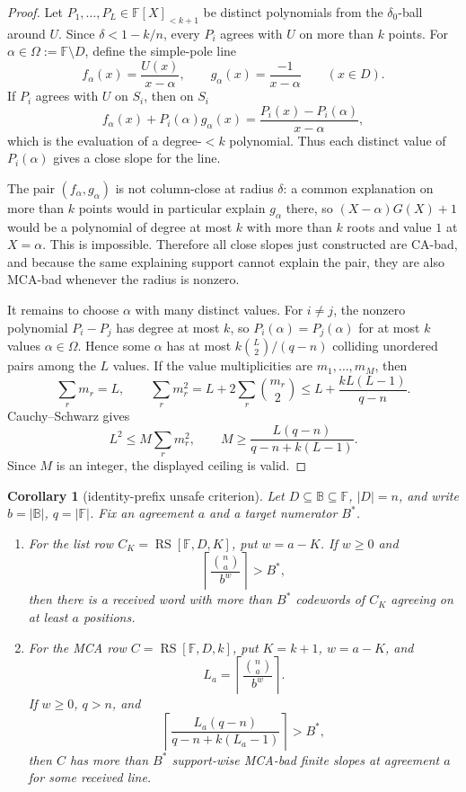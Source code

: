 \documentclass[a4paper,11pt]{amsart}
\newtheorem{corollary}[corollary]{Corollary}
\theoremstyle{remark}
\newcommand{\F}{\mathbb F}
\newcommand{\B}{\mathbb B}
\newcommand{\RS}{\operatorname{RS}}
\begin{document}
\begin{proof}
Let \(P_1,\ldots,P_L\in\F[X]_{<k+1}\) be distinct polynomials from the \(\delta_0\)-ball around \(U\).  Since \(\delta<1-k/n\), every \(P_i\) agrees with \(U\) on more than \(k\) points.  For \(\alpha\in\Omega:=\F\setminus D\), define the simple-pole line
\[
        f_\alpha(x)=\frac{U(x)}{x-\alpha},
        \qquad
        g_\alpha(x)=\frac{-1}{x-\alpha}
        \qquad(x\in D).
\]
If \(P_i\) agrees with \(U\) on \(S_i\), then on \(S_i\)
\[
        f_\alpha(x)+P_i(\alpha)g_\alpha(x)
        =\frac{P_i(x)-P_i(\alpha)}{x-\alpha},
\]
which is the evaluation of a degree-\(<k\) polynomial.  Thus each distinct value of \(P_i(\alpha)\) gives a close slope for the line.

The pair \((f_\alpha,g_\alpha)\) is not column-close at radius \(\delta\): a common explanation on more than \(k\) points would in particular explain \(g_\alpha\) there, so \((X-\alpha)G(X)+1\) would be a polynomial of degree at most \(k\) with more than \(k\) roots and value \(1\) at \(X=\alpha\).  This is impossible.  Therefore all close slopes just constructed are CA-bad, and because the same explaining support cannot explain the pair, they are also MCA-bad whenever the radius is nonzero.

It remains to choose \(\alpha\) with many distinct values.  For \(i\ne j\), the nonzero polynomial \(P_i-P_j\) has degree at most \(k\), so \(P_i(\alpha)=P_j(\alpha)\) for at most \(k\) values \(\alpha\in\Omega\).  Hence some \(\alpha\) has at most \(k\binom L2/(q-n)\) colliding unordered pairs among the \(L\) values.  If the value multiplicities are \(m_1,\ldots,m_M\), then
\[
        \sum_r m_r=L,\qquad
        \sum_r m_r^2
        =L+2\sum_r\binom{m_r}{2}
        \le L+\frac{kL(L-1)}{q-n}.
\]
Cauchy--Schwarz gives
\[
        L^2\le M\sum_r m_r^2,
        \qquad
        M\ge \frac{L(q-n)}{q-n+k(L-1)}.
\]
Since \(M\) is an integer, the displayed ceiling is valid.
\end{proof}

\begin{corollary}[identity-prefix unsafe criterion]\label{cor:identity-prefix-unsafe}
Let \(D\subseteq\B\subseteq\F\), \(|D|=n\), and write \(b=|\B|\), \(q=|\F|\).  Fix an agreement \(a\) and a target numerator \(B^*\).
\begin{enumerate}[label=\textup{(\roman*)}]
\item For the list row \(C_K=\RS[\F,D,K]\), put \(w=a-K\).  If \(w\ge0\) and
\[
        \left\lceil\frac{\binom na}{b^w}\right\rceil>B^*,
\]
then there is a received word with more than \(B^*\) codewords of \(C_K\) agreeing on at least \(a\) positions.
\item For the MCA row \(C=\RS[\F,D,k]\), put \(K=k+1\), \(w=a-K\), and
\[
        L_a=\left\lceil\frac{\binom na}{b^w}\right\rceil .
\]
If \(w\ge0\), \(q>n\), and
\[
        \left\lceil \frac{L_a(q-n)}{q-n+k(L_a-1)}\right\rceil>B^*,
\]
then \(C\) has more than \(B^*\) support-wise MCA-bad finite slopes at agreement \(a\) for some received line.
\end{enumerate}
\end{corollary}
\end{document}
